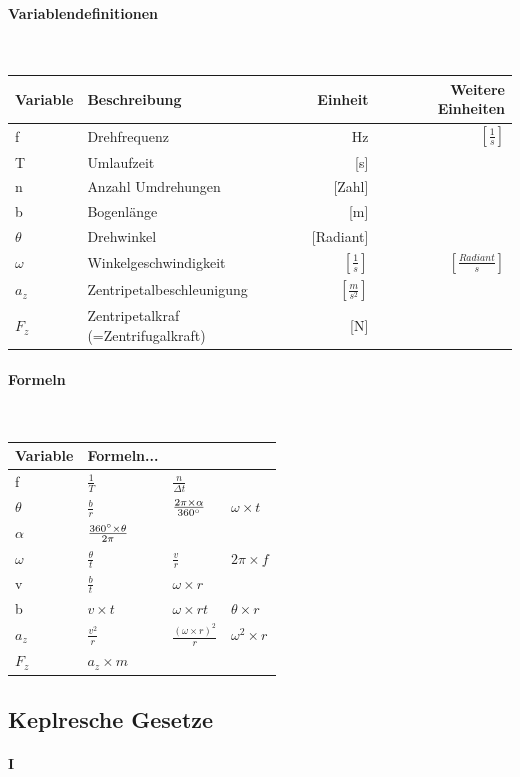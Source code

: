 \documentclass[a4paper,10pt]{article}
\newcommand{\lbparagraph}[1]{\paragraph{#1}\mbox{}\\}
\begin{document}
\lbparagraph{Variablendefinitionen}

\begin{tabular}{l|l|r|r}
    Variable & Beschreibung & Einheit & Weitere Einheiten \\
    \hline
    f & Drehfrequenz & Hz & $[\frac{1}{s}]$ \\
    T & Umlaufzeit & [s] & \\
    n & Anzahl Umdrehungen & [Zahl] &  \\
    b & Bogenlänge & [m] &  \\
    $\theta$ & Drehwinkel & [Radiant] & \\
    $\omega$ & Winkelgeschwindigkeit & $[\frac{1}{s}]$ & $[\frac{Radiant}{s}]$ \\
    $a_z$ & Zentripetalbeschleunigung & $[\frac{m}{s^2}]$ &  \\
    $F_z$ & Zentripetalkraf (=Zentrifugalkraft) & [N] &
\end{tabular}

\lbparagraph{Formeln}

\begin{tabular}{l|l|l|l}
    Variable & Formeln... & & \\
    \hline
    f & $\frac{1}{T}$ & $\frac{n}{\Delta{t}}$ &  \\
    \hline
    $\theta$ & $\frac{b}{r}$ & $\frac{2\pi \times \alpha}{360\degree}$ & $\omega \times t$ \\
    \hline
    $\alpha$ & $\frac{360\degree \times \theta}{2\pi}$ & & \\
    \hline
    $\omega$ & $\frac{\theta}{t}$ & $\frac{v}{r}$ & $2\pi \times f$ \\
    \hline
    v & $\frac{b}{t}$ & $\omega \times r$ & \\
    \hline
    b & $v \times t$ & $\omega \times rt$ & $\theta \times r$ \\
    \hline
    $a_z$ & $\frac{v^2}{r}$ & $\frac{(\omega \times r)^2}{r}$ & $\omega^2 \times r$ \\
    \hline
    $F_z$ & $a_z \times m$ & &
\end{tabular}

\subsection{Keplresche Gesetze}

\paragraph{I}
\end{document}
